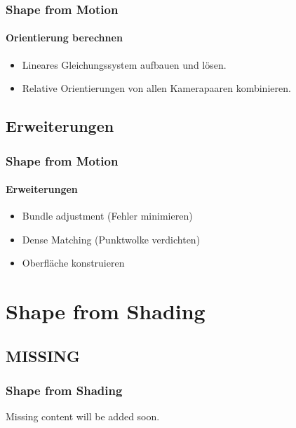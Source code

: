 \documentclass{beamer}
\begin{document}
\begin{frame}
	\frametitle{Shape from Motion}
	\framesubtitle{Orientierung berechnen}
	
	\begin{itemize}
		\item Lineares Gleichungssystem aufbauen und lösen.
		\item Relative Orientierungen von allen Kamerapaaren kombinieren.
	\end{itemize}
\end{frame}


\subsection{Erweiterungen}
\begin{frame}
	\frametitle{Shape from Motion}
	\framesubtitle{Erweiterungen}
	
	\begin{itemize}
		\item Bundle adjustment (Fehler minimieren)
		\item Dense Matching (Punktwolke verdichten)
		\item Oberfläche konstruieren
	\end{itemize}
\end{frame}


\section{Shape from Shading}
\subsection{MISSING}
\begin{frame}
	\frametitle{Shape from Shading}
	
	Missing content will be added soon.
\end{frame}

\end{document}
